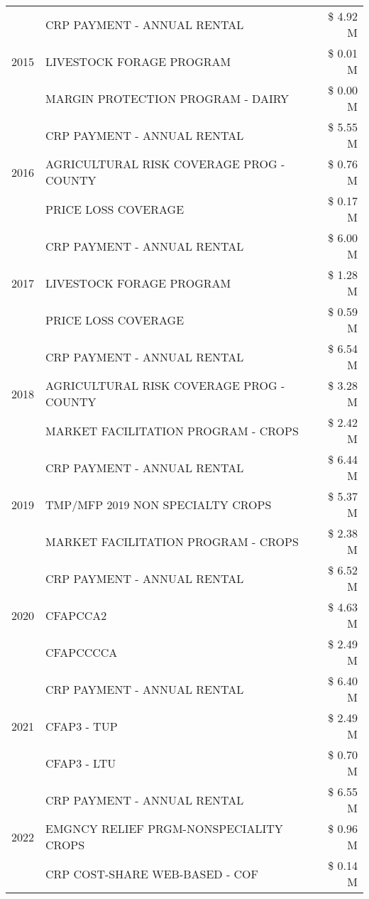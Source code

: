 \begin{tabular}{llr}
\cline{1-3}
\multirow[t]{3}{*}{2015} & CRP PAYMENT - ANNUAL RENTAL & \$ 4.92 M \\
 & LIVESTOCK FORAGE PROGRAM & \$ 0.01 M \\
 & MARGIN PROTECTION PROGRAM - DAIRY & \$ 0.00 M \\
\cline{1-3}
\multirow[t]{3}{*}{2016} & CRP PAYMENT - ANNUAL RENTAL & \$ 5.55 M \\
 & AGRICULTURAL RISK COVERAGE PROG - COUNTY & \$ 0.76 M \\
 & PRICE LOSS COVERAGE & \$ 0.17 M \\
\cline{1-3}
\multirow[t]{3}{*}{2017} & CRP PAYMENT - ANNUAL RENTAL & \$ 6.00 M \\
 & LIVESTOCK FORAGE PROGRAM & \$ 1.28 M \\
 & PRICE LOSS COVERAGE & \$ 0.59 M \\
\cline{1-3}
\multirow[t]{3}{*}{2018} & CRP PAYMENT - ANNUAL RENTAL & \$ 6.54 M \\
 & AGRICULTURAL RISK COVERAGE PROG - COUNTY & \$ 3.28 M \\
 & MARKET FACILITATION PROGRAM - CROPS & \$ 2.42 M \\
\cline{1-3}
\multirow[t]{3}{*}{2019} & CRP PAYMENT - ANNUAL RENTAL & \$ 6.44 M \\
 & TMP/MFP 2019 NON SPECIALTY CROPS & \$ 5.37 M \\
 & MARKET FACILITATION PROGRAM - CROPS & \$ 2.38 M \\
\cline{1-3}
\multirow[t]{3}{*}{2020} & CRP PAYMENT - ANNUAL RENTAL & \$ 6.52 M \\
 & CFAPCCA2 & \$ 4.63 M \\
 & CFAPCCCCA & \$ 2.49 M \\
\cline{1-3}
\multirow[t]{3}{*}{2021} & CRP PAYMENT - ANNUAL RENTAL & \$ 6.40 M \\
 & CFAP3 - TUP & \$ 2.49 M \\
 & CFAP3 - LTU & \$ 0.70 M \\
\cline{1-3}
\multirow[t]{3}{*}{2022} & CRP PAYMENT - ANNUAL RENTAL & \$ 6.55 M \\
 & EMGNCY RELIEF PRGM-NONSPECIALITY CROPS & \$ 0.96 M \\
 & CRP COST-SHARE WEB-BASED - COF & \$ 0.14 M \\
\cline{1-3}
\bottomrule
\end{tabular}
